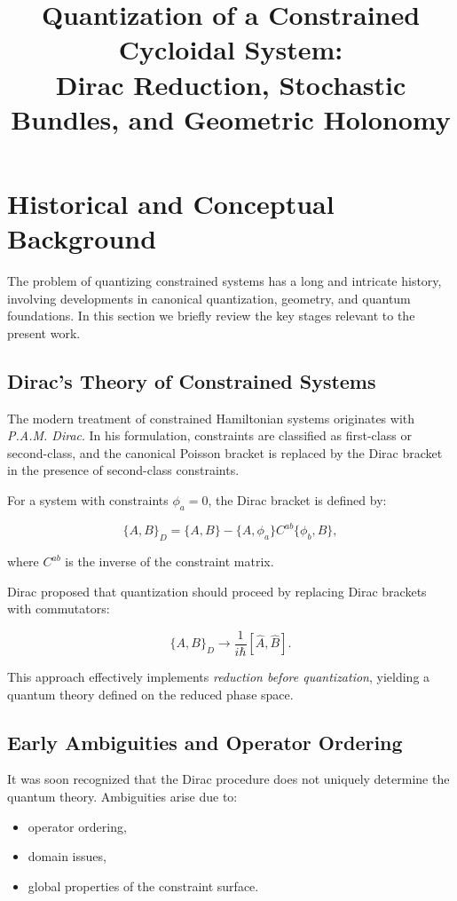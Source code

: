 \documentclass[11pt]{article}
\title{Quantization of a Constrained Cycloidal System:\\
Dirac Reduction, Stochastic Bundles, and Geometric Holonomy}
\author{}
\date{}
\begin{document}
\section{Historical and Conceptual Background}

The problem of quantizing constrained systems has a long and intricate history, involving developments in canonical quantization, geometry, and quantum foundations. In this section we briefly review the key stages relevant to the present work.

\subsection{Dirac's Theory of Constrained Systems}

The modern treatment of constrained Hamiltonian systems originates with \textit{P.A.M. Dirac}. In his formulation, constraints are classified as first-class or second-class, and the canonical Poisson bracket is replaced by the Dirac bracket in the presence of second-class constraints.

For a system with constraints $\phi_a=0$, the Dirac bracket is defined by:

\begin{equation}
\{A,B\}_D = \{A,B\}
- \{A,\phi_a\} C^{ab} \{\phi_b,B\},
\end{equation}

where $C^{ab}$ is the inverse of the constraint matrix.

Dirac proposed that quantization should proceed by replacing Dirac brackets with commutators:

\begin{equation}
\{A,B\}_D \rightarrow \frac{1}{i\hbar}[\hat{A},\hat{B}].
\end{equation}

This approach effectively implements \emph{reduction before quantization}, yielding a quantum theory defined on the reduced phase space.

\subsection{Early Ambiguities and Operator Ordering}

It was soon recognized that the Dirac procedure does not uniquely determine the quantum theory. Ambiguities arise due to:

\begin{itemize}
\item operator ordering,
\item domain issues,
\item global properties of the constraint surface.
\end{itemize}
\end{document}
